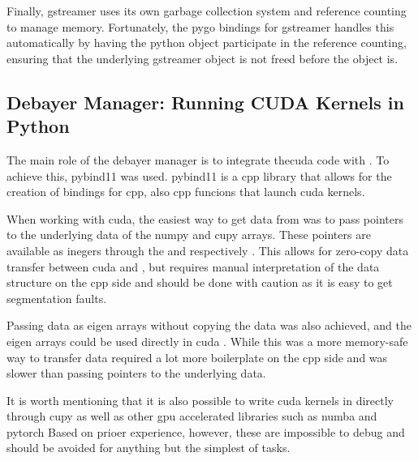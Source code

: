Finally, \gls{gstreamer} uses its own garbage collection system and reference counting to manage memory.
Fortunately, the \gls{pygo} bindings for \gls{gstreamer} handles this automatically by having the python object participate in the reference counting, ensuring that the underlying \gls{gstreamer} object is not freed before the \py object is.


\subsection{Debayer Manager: Running CUDA Kernels in Python}
The main role of the debayer manager is to integrate the\gls{cuda} code with \py.
To achieve this, \gls{pybind11} was used.
\gls{pybind11} is a \gls{cpp} library that allows for the creation of \py bindings for \gls{cpp}, also \gls{cpp} funcions that launch \gls{cuda} kernels.

When working with \gls{cuda}, the easiest way to get data from \py was to pass pointers to the underlying data of the \gls{numpy} and \gls{cupy} arrays.
These pointers are available as inegers through the  and  respectively \cite{numpyArrayInterfaceProtocol} \cite{cupyInteroperabilityCuPy12}.
This allows for zero-copy data transfer between \gls{cuda} and \py, but requires manual interpretation of the data structure on the \gls{cpp} side and should be done with caution as it is easy to get segmentation faults.

Passing data as \gls{eigen} arrays without copying the data was also achieved, and the \gls{eigen} arrays could be used directly in \gls{cuda} \cite{wenzelEigenPybind11Documentation2017} \cite{eigenEigenUsingEigen}.
While this was a more memory-safe way to transfer data required a lot more boilerplate on the \gls{cpp} side and was slower than passing pointers to the underlying data.


It is worth mentioning that it is also possible to write \gls{cuda} kernels in \py directly through \gls{cupy} as well as other \gls{gpu} accelerated libraries such as \gls{numba} and \gls{pytorch}
Based on prioer experience, however, these are impossible to debug and should be avoided for anything but the simplest of tasks.